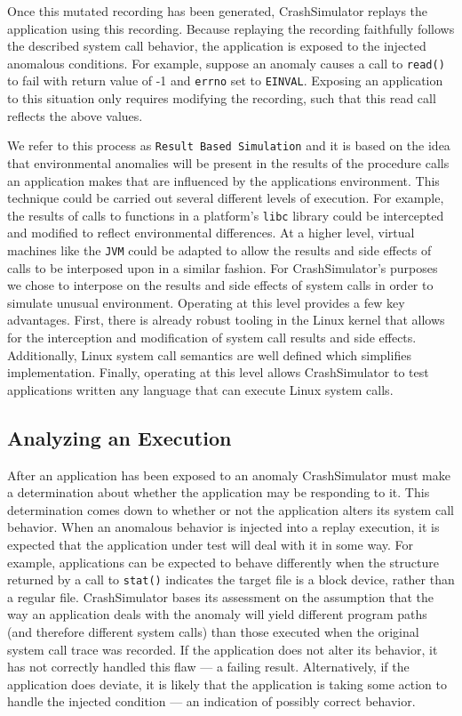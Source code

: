 Once this mutated recording has been generated, CrashSimulator replays the
application using this recording.
Because replaying the
recording faithfully follows the described system call behavior, the
application is exposed to the injected
anomalous conditions.  For
example, suppose an anomaly causes a call to {\tt read()} to fail with
return value of -1 and {\tt errno} set to {\tt EINVAL}.  Exposing an
application to this situation only requires modifying the recording,
such that this read call reflects the above values.

We refer to this process as {\tt Result Based Simulation} and it is based
on the idea that environmental anomalies will be present in the results of
the procedure calls an application makes that are influenced by the
applications environment.
This technique could be carried out several different levels
of execution.  For example, the results of calls to functions in a
platform's {\tt libc} library could be intercepted and modified to reflect
environmental differences.  At a higher level, virtual machines like the
{\tt JVM} could be adapted to allow the results and side effects of calls
to be interposed upon in a similar fashion.
For CrashSimulator's purposes we chose to interpose
on the results and side effects of system calls in order to simulate
unusual environment.  Operating at this level provides a few key
advantages.  First, there is already robust tooling in the Linux kernel
that allows for the interception and modification of system call results
and side effects.  Additionally, Linux system call semantics are well
defined which simplifies implementation.  Finally, operating at this level
allows CrashSimulator to test applications written any language that can
execute Linux system calls.

\subsection{Analyzing an Execution}

After an application has been exposed to an anomaly CrashSimulator must
make a determination about whether the application may be responding to it.
This determination comes down to whether or not
the application alters its
system call behavior.  When an anomalous
behavior is injected into a replay execution,
it is expected that the application under
test will deal with it in some way.  For example, applications can
be expected to behave differently when the structure returned by a call to
{\tt stat()} indicates the target file is a block device,
rather than a regular
file.  CrashSimulator bases its assessment on the assumption that the way
an
application deals with the anomaly will yield
different program paths (and therefore different system calls) than
those
executed when the original system call trace was recorded.
If the application
does not alter its behavior, it has not
correctly handled this flaw --- a failing result.  Alternatively, if the
application does deviate, it is likely that the application is taking some
action to handle the injected condition --- an indication of possibly
correct behavior.

